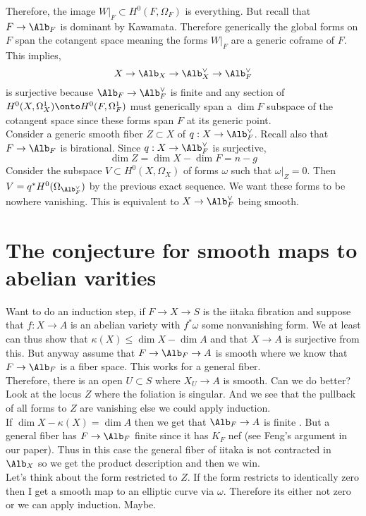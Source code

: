 \documentclass[12pt]{article}
\begin{document}
\begin{rmk}
Therefore, the image $W|_F \subset H^0(F, \Omega_F)$ is everything. But recall that $F \to \Alb_F$ is dominant by Kawamata. Therefore generically the global forms on $F$ span the cotangent space meaning the forms $W|_F$ are a generic coframe of $F$. This implies,
\[ X \to \Alb_X \to \Alb_X^\vee \to \Alb_F^\vee \]
is surjective because $\Alb_F \to \Alb_F^\vee$ is finite and any section of $H^0(X, \Omega_X^1) \onto H^0(F, \Omega^1_F)$ must generically span a $\dim{F}$ subspace of the cotangent space since these forms span $F$ at its generic point.
\bigskip\\
Consider a generic smooth fiber $Z \subset X$ of $q : X \to \Alb_F^\vee$. Recall also that $F \to \Alb_F$ is birational. Since $q : X \to \Alb_F^\vee$ is surjective,
\[ \dim{Z} = \dim{X} - \dim{F} = n - g \]
Consider the subspace $V \subset H^0(X, \Omega_X)$ of forms $\omega$ such that $\omega|_Z = 0$. Then $V = q^* H^0(\Omega_{\Alb_F^\vee})$ by the previous exact sequence. We want these forms to be nowhere vanishing. This is equivalent to $X \to \Alb_F^\vee$ being smooth.
\end{rmk}

\section{The conjecture for smooth maps to abelian varities}

Want to do an induction step, if $F \to X \to S$ is the iitaka fibration and suppose that $f : X \to A$ is an abelian variety with $f^* \omega$ some nonvanishing form. We at least can thus show that $\kappa(X) \le \dim{X} - \dim{A}$ and that $X \to A$ is surjective from this. But anyway assume that $F \to \Alb_F \to A$ is smooth where we know that $F \to \Alb_F$ is a fiber space. This works for a general fiber. 
\bigskip\\
Therefore, there is an open $U \subset S$ where $X_U \to A$ is smooth. Can we do better? Look at the locus $Z$ where the foliation is singular. And we see that the pullback of all forms to $Z$ are vanishing else we could apply induction.
\bigskip\\
If $\dim{X} - \kappa(X) = \dim{A}$ then we get that $\Alb_F \to A$ is finite \etale. But a general fiber has $F \to \Alb_F$ finite \etale since it has $K_F$ nef (see Feng's argument in our paper). Thus in this case the general fiber of iitaka is not contracted in $\Alb_X$ so we get the product description and then we win.
\bigskip\\
Let's think about the form restricted to $Z$.  If the form restricts to identically zero then I get a smooth map to an elliptic curve via $\omega$. Therefore its either not zero or we can apply induction. Maybe. 
\end{document}
